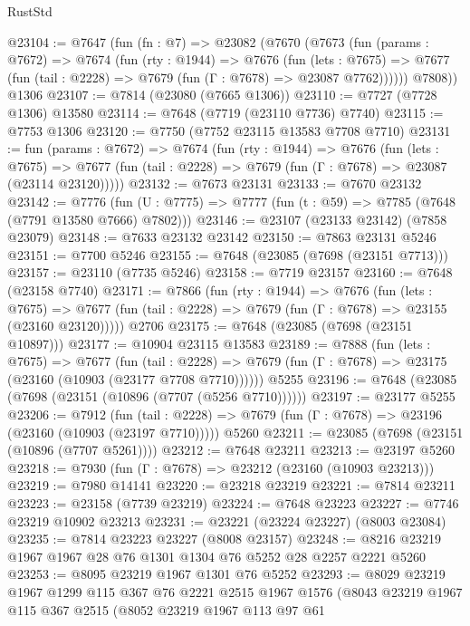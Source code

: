 \begin{lexlean}{RustStd}
\begin{coremodule}
@23104 := @7647
    (fun (fn : @7) =>
    @23082
      (@7670
        (@7673
          (fun (params : @7672) =>
          @7674
            (fun (rty : @1944) =>
            @7676
              (fun (lets : @7675) =>
              @7677 (fun (tail : @2228) => @7679 (fun (Γ : @7678) => @23087 @7762))))))
        @7808))
    @1306
@23107 := @7814 (@23080 (@7665 @1306))
@23110 := @7727 (@7728 @1306) @13580
@23114 := @7648 (@7719 (@23110 @7736) @7740)
@23115 := @7753 @1306
@23120 := @7750 (@7752 @23115 @13583 @7708 @7710)
@23131 := fun (params : @7672) =>
  @7674
    (fun (rty : @1944) =>
    @7676
      (fun (lets : @7675) =>
      @7677 (fun (tail : @2228) => @7679 (fun (Γ : @7678) => @23087 (@23114 @23120)))))
@23132 := @7673 @23131
@23133 := @7670 @23132
@23142 := @7776
    (fun (U : @7775) => @7777 (fun (t : @59) => @7785 (@7648 (@7791 @13580 @7666) @7802)))
@23146 := @23107 (@23133 @23142) (@7858 @23079)
@23148 := @7633 @23132 @23142
@23150 := @7863 @23131 @5246
@23151 := @7700 @5246
@23155 := @7648 (@23085 (@7698 (@23151 @7713)))
@23157 := @23110 (@7735 @5246)
@23158 := @7719 @23157
@23160 := @7648 (@23158 @7740)
@23171 := @7866
    (fun (rty : @1944) =>
    @7676
      (fun (lets : @7675) =>
      @7677 (fun (tail : @2228) => @7679 (fun (Γ : @7678) => @23155 (@23160 @23120)))))
    @2706
@23175 := @7648 (@23085 (@7698 (@23151 @10897)))
@23177 := @10904 @23115 @13583
@23189 := @7888
    (fun (lets : @7675) =>
    @7677
      (fun (tail : @2228) =>
      @7679 (fun (Γ : @7678) => @23175 (@23160 (@10903 (@23177 @7708 @7710))))))
    @5255
@23196 := @7648 (@23085 (@7698 (@23151 (@10896 (@7707 (@5256 @7710))))))
@23197 := @23177 @5255
@23206 := @7912
    (fun (tail : @2228) => @7679 (fun (Γ : @7678) => @23196 (@23160 (@10903 (@23197 @7710)))))
    @5260
@23211 := @23085 (@7698 (@23151 (@10896 (@7707 @5261))))
@23212 := @7648 @23211
@23213 := @23197 @5260
@23218 := @7930 (fun (Γ : @7678) => @23212 (@23160 (@10903 @23213)))
@23219 := @7980 @14141
@23220 := @23218 @23219
@23221 := @7814 @23211
@23223 := @23158 (@7739 @23219)
@23224 := @7648 @23223
@23227 := @7746 @23219 @10902 @23213
@23231 := @23221 (@23224 @23227) (@8003 @23084)
@23235 := @7814 @23223 @23227 (@8008 @23157)
@23248 := @8216 @23219 @1967 @1967 @28 @76 @1301 @1304 @76 @5252 @28 @2257 @2221 @5260
@23253 := @8095 @23219 @1967 @1301 @76 @5252
@23293 := @8029
    @23219
    @1967
    @1299
    @115
    @367
    @76
    @2221
    @2515
    @1967
    @1576
    (@8043
      @23219
      @1967
      @115
      @367
      @2515
      (@8052
        @23219
        @1967
        @113
        @97
        @61

\end{coremodule}
\end{lexlean}

